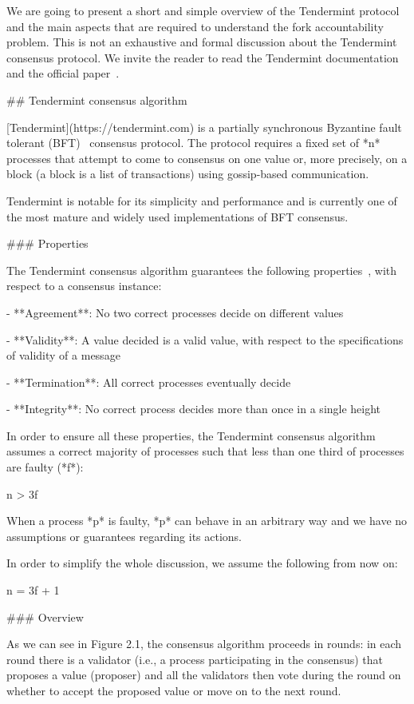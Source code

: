 \documentclass[a4paper,11pt,oneside]{report}
\begin{document}
\begin{markdown}

We are going to present a short and simple overview of the Tendermint protocol and the main aspects that are required to understand the fork accountability problem.
This is not an exhaustive and formal discussion about the Tendermint consensus protocol. We invite the reader to read the Tendermint documentation~\cite{tendermint-doc} and the official paper~\cite{buchman2018latest}.

## Tendermint consensus algorithm

[Tendermint](https://tendermint.com) is a partially synchronous Byzantine fault tolerant (BFT)~\cite{wiki:bft} consensus protocol. The protocol requires a fixed set of *n* processes that attempt to come to consensus on one value or, more precisely, on a block (a block is a list of transactions) using gossip-based communication. 

Tendermint is notable for its simplicity and performance and is currently one of the most mature and widely used implementations of BFT consensus.

### Properties 

The Tendermint consensus algorithm guarantees the following properties~\cite{buchman2018latest}, with respect to a consensus instance:

- **Agreement**: No two correct processes decide on different values

- **Validity**: A value decided is a valid value, with respect to the specifications of validity of a message

- **Termination**: All correct processes eventually decide

- **Integrity**: No correct process decides more than once in a single height 

In order to ensure all these properties, the Tendermint consensus algorithm assumes a correct majority of processes such that less than one third of processes are faulty (*f*):
 
    n > 3f
 
When a process *p* is faulty, *p* can behave in an arbitrary way and we have no assumptions or guarantees regarding its actions.
 
In order to simplify the whole discussion, we assume the following from now on:
 
    n = 3f + 1

### Overview

As we can see in Figure 2.1, the consensus algorithm proceeds in rounds: in each round there is a validator (i.e., a process participating in the consensus) that proposes a value (proposer) and all the validators then vote during the round on whether to accept the proposed value or move on to the next round.


\end{markdown}
\end{document}
